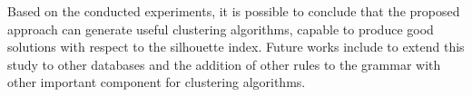 \documentclass[conference,compsoc]{IEEEtran}
\begin{document}
Based on the conducted experiments, it is possible to conclude that the proposed approach can generate useful clustering algorithms, capable to produce good solutions with respect to the silhouette index. Future works include to extend this study to other databases and the addition of other rules to the grammar with other important component for clustering algorithms.








\end{document}

